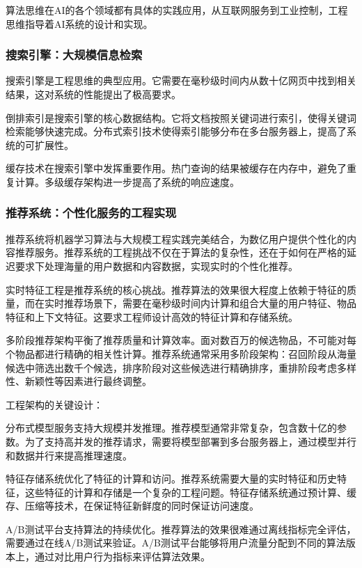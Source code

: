 算法思维在AI的各个领域都有具体的实践应用，从互联网服务到工业控制，工程思维指导着AI系统的设计和实现。

\subsubsection{搜索引擎：大规模信息检索}

搜索引擎是工程思维的典型应用。它需要在毫秒级时间内从数十亿网页中找到相关结果，这对系统的性能提出了极高要求。

倒排索引是搜索引擎的核心数据结构。它将文档按照关键词进行索引，使得关键词检索能够快速完成。分布式索引技术使得索引能够分布在多台服务器上，提高了系统的可扩展性。

缓存技术在搜索引擎中发挥重要作用。热门查询的结果被缓存在内存中，避免了重复计算。多级缓存架构进一步提高了系统的响应速度。

\subsubsection{推荐系统：个性化服务的工程实现}

推荐系统将机器学习算法与大规模工程实践完美结合，为数亿用户提供个性化的内容推荐服务。推荐系统的工程挑战不仅在于算法的复杂性，还在于如何在严格的延迟要求下处理海量的用户数据和内容数据，实现实时的个性化推荐。

实时特征工程是推荐系统的核心挑战。推荐算法的效果很大程度上依赖于特征的质量，而在实时推荐场景下，需要在毫秒级时间内计算和组合大量的用户特征、物品特征和上下文特征。这要求工程师设计高效的特征计算和存储系统。

多阶段推荐架构平衡了推荐质量和计算效率。面对数百万的候选物品，不可能对每个物品都进行精确的相关性计算。推荐系统通常采用多阶段架构：召回阶段从海量候选中筛选出数千个候选，排序阶段对这些候选进行精确排序，重排阶段考虑多样性、新颖性等因素进行最终调整。

工程架构的关键设计：

分布式模型服务支持大规模并发推理。推荐模型通常非常复杂，包含数十亿的参数。为了支持高并发的推荐请求，需要将模型部署到多台服务器上，通过模型并行和数据并行来提高推理速度。

特征存储系统优化了特征的计算和访问。推荐系统需要大量的实时特征和历史特征，这些特征的计算和存储是一个复杂的工程问题。特征存储系统通过预计算、缓存、压缩等技术，在保证特征新鲜度的同时保证访问速度。

A/B测试平台支持算法的持续优化。推荐算法的效果很难通过离线指标完全评估，需要通过在线A/B测试来验证。A/B测试平台能够将用户流量分配到不同的算法版本上，通过对比用户行为指标来评估算法效果。

